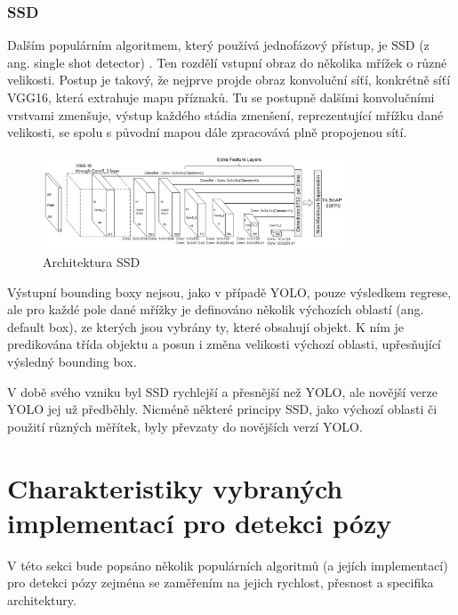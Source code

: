\subsubsection*{SSD}
Dalším populárním algoritmem, který používá jednofázový přístup, je SSD (z ang.
single shot detector) \cite{szegedy:ssd}. Ten rozdělí vstupní obraz do několika
mřížek o různé velikosti. Postup je takový, že nejprve projde obraz konvoluční
síťí, konkrétně síťí VGG16, která extrahuje mapu příznaků. Tu se postupně
dalšími konvolučními vrstvami zmenšuje, výstup každého stádia zmenšení,
reprezentující mřížku dané velikosti, se spolu s původní mapou dále zpracovává
plně propojenou sítí.
\begin{figure}[]
    \centering
    \includegraphics[width=0.8\textwidth]{Figures/ssd.png}
    \caption{Architektura SSD \cite{szegedy:ssd}}
    \label{fig:ssd}
\end{figure}

Výstupní bounding boxy nejsou, jako v případě YOLO, pouze výsledkem regrese,
ale pro každé pole dané mřížky je definováno několik výchozích oblastí (ang.
default box), ze kterých jsou vybrány ty, které obsahují objekt. K ním je
predikována třída objektu a posun i změna velikosti výchozí oblasti,
upřesňující výsledný bounding box.

V době svého vzniku byl SSD rychlejší a přesnější než YOLO, ale novější verze
YOLO jej už předběhly. Nicméně některé principy SSD, jako výchozí oblasti či
použití různých měřítek, byly převzaty do novějších verzí YOLO.

\section{Charakteristiky vybraných implementací pro detekci pózy}

V této sekci bude popsáno několik populárních algoritmů (a jejích implementací)
pro detekci pózy zejména se zaměřením na jejich rychlost, přesnost a specifika
architektury.

